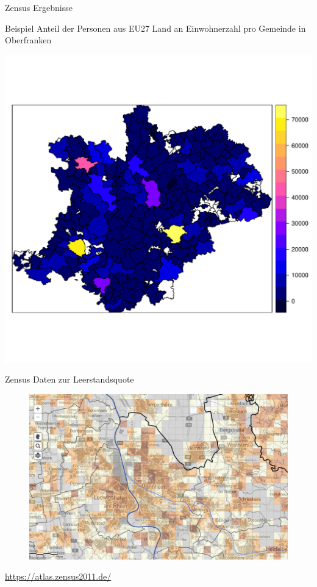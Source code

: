 \documentclass[ignorenonframetext,]{beamer}
\begin{document}
\begin{frame}{Zensus Ergebnisse}

Beispiel Anteil der Personen aus EU27 Land an Einwohnerzahl pro Gemeinde
in Oberfranken

\includegraphics{figure/KRSBamberg_EWZ.pdf}

\end{frame}

\begin{frame}{Zensus Daten zur Leerstandsquote}

\begin{figure}
\centering
\includegraphics{figure/Leerstandsquote.PNG}
\caption{}
\end{figure}

\url{https://atlas.zensus2011.de/}

\end{frame}
\end{document}
